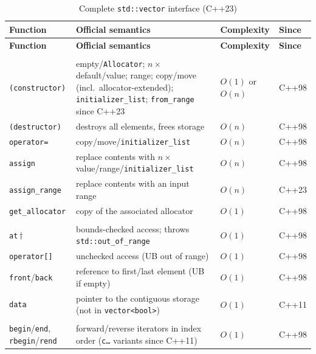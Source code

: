 \begin{longtable}{@{}>{\raggedright\arraybackslash}p{3.1cm} >{\raggedright\arraybackslash}p{5.7cm} >{\raggedright\arraybackslash}p{2.7cm} >{\raggedright\arraybackslash}p{1.1cm}@{}}
  \caption{Complete \texttt{std::vector} interface (C++23)}\label{tab:if-vector}\\
  \toprule
  \textbf{Function} & \textbf{Official semantics} & \textbf{Complexity} & \textbf{Since} \\
  \midrule
\endfirsthead%
  \toprule
  \textbf{Function} & \textbf{Official semantics} & \textbf{Complexity} & \textbf{Since} \\
  \midrule
\endhead%
  \multicolumn{4}{@{}l}{\textbf{Construction, assignment, allocator}}\\
  \addlinespace[2pt]
  \texttt{(constructor)} & empty/\texttt{Allocator}; $n\times$ default/value; range; copy/move (incl.\ allocator-extended); \texttt{initializer\_list}; \texttt{from\_range} since C++23 & $O(1)$ or $O(n)$ & C++98 \\
  \texttt{(destructor)} & destroys all elements, frees storage & $O(n)$ & C++98 \\
  \texttt{operator=} & copy/move/\texttt{initializer\_list} & $O(n)$ & C++98 \\
  \texttt{assign} & replace contents with $n\times$ value/\allowbreak{}range/\allowbreak{}\texttt{initializer\_\allowbreak{}list} & $O(n)$ & C++98 \\
  \texttt{assign\_range} & replace contents with an input range & $O(n)$ & C++23 \\
  \texttt{get\_allocator} & copy of the associated allocator & $O(1)$ & C++98 \\
  \addlinespace[3pt]
  \multicolumn{4}{@{}l}{\textbf{Element access}}\\
  \addlinespace[2pt]
  \texttt{at}\,$\dagger$ & bounds-checked access; throws \texttt{std::out\_of\_range} & $O(1)$ & C++98 \\
  \texttt{operator[]} & unchecked access (UB out of range) & $O(1)$ & C++98 \\
  \texttt{front}/\texttt{back} & reference to first/last element (UB if empty) & $O(1)$ & C++98 \\
  \texttt{data} & pointer to the contiguous storage (not in \texttt{vector<bool>}) & $O(1)$ & C++11 \\
  \addlinespace[3pt]
  \multicolumn{4}{@{}l}{\textbf{Iterators}}\\
  \addlinespace[2pt]
  \texttt{begin}/\texttt{end}, \texttt{rbegin}/\texttt{rend} & forward/reverse iterators in index order (\texttt{c…} variants since C++11) & $O(1)$ & C++98 \\

\end{longtable}
